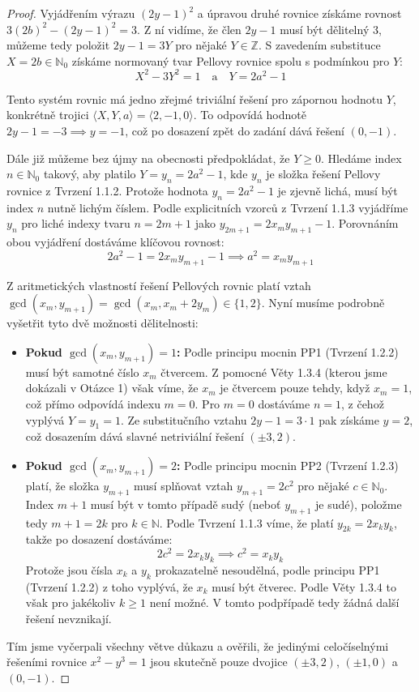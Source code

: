 \documentclass[a4paper,12pt]{article}
\begin{document}
\begin{proof}
Vyjádřením výrazu $(2y - 1)^2$ a úpravou druhé rovnice získáme rovnost $3(2b)^2 - (2y - 1)^2 = 3$. Z ní vidíme, že člen $2y - 1$ musí být dělitelný 3, můžeme tedy položit $2y - 1 = 3Y$ pro nějaké $Y \in \mathbb{Z}$. S zavedením substituce $X = 2b \in \mathbb{N}_0$ získáme normovaný tvar Pellovy rovnice spolu s podmínkou pro $Y$:
$$X^2 - 3Y^2 = 1 \quad \text{a} \quad Y = 2a^2 - 1$$ 

Tento systém rovnic má jedno zřejmé triviální řešení pro zápornou hodnotu $Y$, konkrétně trojici $\langle X, Y, a \rangle = \langle 2, -1, 0 \rangle$. To odpovídá hodnotě $2y - 1 = -3 \implies y = -1$, což po dosazení zpět do zadání dává řešení $(0, -1)$.

Dále již můžeme bez újmy na obecnosti předpokládat, že $Y \ge 0$. Hledáme index $n \in \mathbb{N}_0$ takový, aby platilo $Y = y_n = 2a^2 - 1$, kde $y_n$ je složka řešení Pellovy rovnice z Tvrzení 1.1.2. Protože hodnota $y_n = 2a^2 - 1$ je zjevně lichá, musí být index $n$ nutně lichým číslem. Podle explicitních vzorců z Tvrzení 1.1.3 vyjádříme $y_n$ pro liché indexy tvaru $n = 2m + 1$ jako $y_{2m+1} = 2x_m y_{m+1} - 1$. Porovnáním obou vyjádření dostáváme klíčovou rovnost:
$$2a^2 - 1 = 2x_m y_{m+1} - 1 \implies a^2 = x_m y_{m+1}$$ 

Z aritmetických vlastností řešení Pellových rovnic platí vztah $\gcd(x_m, y_{m+1}) = \gcd(x_m, x_m + 2y_m) \in \{1, 2\}$. Nyní musíme podrobně vyšetřit tyto dvě možnosti dělitelnosti:

\begin{itemize}
    \item \textbf{Pokud $\gcd(x_m, y_{m+1}) = 1$:} Podle principu mocnin PP1 (Tvrzení 1.2.2) musí být samotné číslo $x_m$ čtvercem. Z pomocné Věty 1.3.4 (kterou jsme dokázali v Otázce 1) však víme, že $x_m$ je čtvercem pouze tehdy, když $x_m = 1$, což přímo odpovídá indexu $m = 0$. Pro $m = 0$ dostáváme $n = 1$, z čehož vyplývá $Y = y_1 = 1$. Ze substitučního vztahu $2y - 1 = 3 \cdot 1$ pak získáme $y = 2$, což dosazením dává slavné netriviální řešení $(\pm3, 2)$.
    
    \item \textbf{Pokud $\gcd(x_m, y_{m+1}) = 2$:} Podle principu mocnin PP2 (Tvrzení 1.2.3) platí, že složka $y_{m+1}$ musí splňovat vztah $y_{m+1} = 2c^2$ pro nějaké $c \in \mathbb{N}_0$. Index $m+1$ musí být v tomto případě sudý (neboť $y_{m+1}$ je sudé), položme tedy $m+1 = 2k$ pro $k \in \mathbb{N}$. Podle Tvrzení 1.1.3 víme, že platí $y_{2k} = 2x_k y_k$, takže po dosazení dostáváme:
    $$2c^2 = 2x_k y_k \implies c^2 = x_k y_k$$ 
    Protože jsou čísla $x_k$ a $y_k$ prokazatelně nesoudělná, podle principu PP1 (Tvrzení 1.2.2) z toho vyplývá, že $x_k$ musí být čtverec. Podle Věty 1.3.4 to však pro jakékoliv $k \ge 1$ není možné. V tomto podpřípadě tedy žádná další řešení nevznikají.
\end{itemize}

Tím jsme vyčerpali všechny větve důkazu a ověřili, že jedinými celočíselnými řešeními rovnice $x^2 - y^3 = 1$ jsou skutečně pouze dvojice $(\pm3,2)$, $(\pm1,0)$ a $(0,-1)$.
\end{proof}
\end{document}
